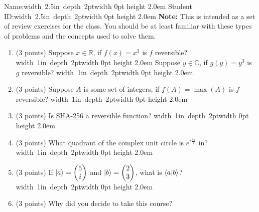 \documentclass[12pt]{article}
\newcommand{\Blank}{\mbox{\hskip 4pt\vrule width 1in depth 2pt}\vrule width 0pt height 2.0em}
\newcommand{\NameBlank}{\mbox{\hskip 4pt\vrule width 2.5in depth 2pt}\vrule width 0pt height 2.0em}
\begin{document}

\noindent Name:\NameBlank{}   Student ID:\NameBlank{} \newline
\newline
\noindent \textbf{Note:} This is intended as a set of review exercises for the class. You should be at least familiar with these types of problems and the concepts used to solve them.

\begin{enumerate}[font=\bfseries]
    \item (3 points) Suppose $x \in \mathbb{R}$, if $f(x) = x^3$ is $f$ reversible? \Blank{} Suppose $y \in \mathbb{C}$, if $g(y) = y^3$ is $g$ reversible? \Blank{}
    \item (3 points) Suppose $A$ is some set of integers, if $f(A) = \max{(A)}$ is $f$ reversible? \Blank{}
    \item (3 points) Is \href{https://en.wikipedia.org/wiki/SHA-2}{SHA-256} a reversible function? \Blank{} 
    \item (3 points) What quadrant of the complex unit circle is $e^{i\frac{3\pi}{4}}$ in?\Blank{}
    \item (3 points) If $\ket{a} = \begin{pmatrix}5 \\ i \end{pmatrix}$ and $\ket{b} = \begin{pmatrix}2 \\ 3 \end{pmatrix}$, what is $\braket{a|b}$?\Blank{}
    \item (3 points) Why did you decide to take this course? \newline
    
\end{enumerate}
\end{document}
